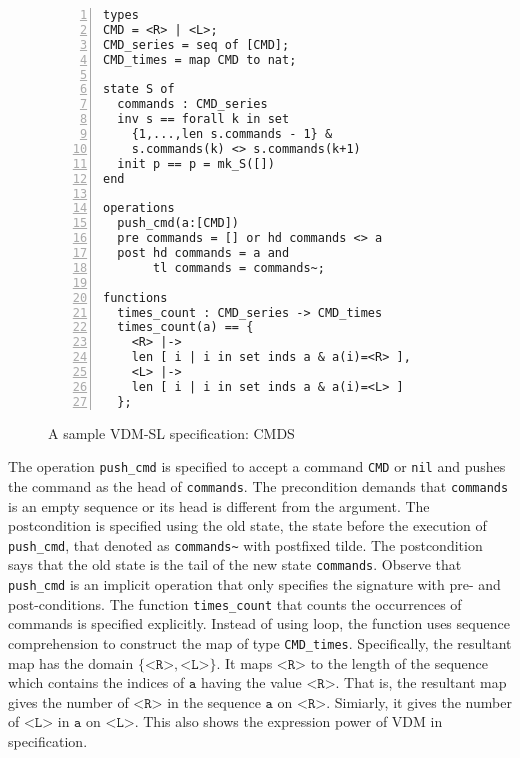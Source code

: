 \begin{figure}[t]
\begin{center}
\begin{mdframed}[roundcorner=5pt]
\begin{Verbatim}[fontsize=\small,numbers=left]
types
CMD = <R> | <L>;
CMD_series = seq of [CMD];
CMD_times = map CMD to nat;

state S of
  commands : CMD_series
  inv s == forall k in set 
    {1,...,len s.commands - 1} &
    s.commands(k) <> s.commands(k+1)
  init p == p = mk_S([])
end

operations
  push_cmd(a:[CMD])
  pre commands = [] or hd commands <> a
  post hd commands = a and
       tl commands = commands~;

functions
  times_count : CMD_series -> CMD_times
  times_count(a) == {
    <R> |->
    len [ i | i in set inds a & a(i)=<R> ],
    <L> |->
    len [ i | i in set inds a & a(i)=<L> ]
  };
\end{Verbatim}
\end{mdframed}
\vspace{-10pt}
\caption{A sample VDM-SL specification: CMDS}
\label{fig:module_sample}
\vspace{-20pt}
\end{center}
\end{figure}

The operation {\tt push\_cmd} is specified to accept a command {\tt CMD} or {\tt nil} and pushes the command as the head of {\tt commands}. The precondition demands that \texttt{commands} is an empty sequence or its head is different from the argument. The postcondition is specified using the old state, the state before the execution of {\tt push\_cmd}, that denoted as {\tt commands\textasciitilde} with postfixed tilde. The postcondition says that the old state is the tail of the new state {\tt commands}. Observe that {\tt push\_cmd} is an implicit operation that only specifies the signature with pre- and post-conditions. The function \texttt{times\_count} that counts the occurrences of commands is specified explicitly. Instead of using loop, the function uses sequence comprehension to construct the map of type {\tt CMD\_times}. Specifically, the resultant map has the domain $\{ \texttt{<R>}, \texttt{<L>} \}$. It maps $\texttt{<R>}$ to the length of the sequence which contains the indices of $\texttt{a}$ having the value $\texttt{<R>}$. That is, the resultant map gives the number of $\texttt{<R>}$ in the sequence $\texttt{a}$ on $\texttt{<R>}$. Simiarly, it gives the number of $\texttt{<L>}$ in $\texttt{a}$ on $\texttt{<L>}$. This also shows the expression power of VDM in specification. 

